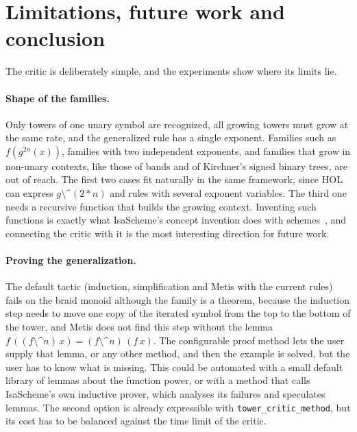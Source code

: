 \documentclass[preprint,12pt]{elsarticle}
\newcommand{\pw}[2]{#1^{#2}}               %
\newcommand{\pp}{\mathbin{\texttt{\^{}\^{}}}}     %
\newcommand{\fp}[2]{(#1 \pp #2)}                  %
\newcommand{\isa}[1]{\texttt{#1}}
\begin{document}
\section{Limitations, future work and conclusion}
\label{sec:conclusion}

The critic is deliberately simple, and the experiments show where its
limits lie.

\paragraph{Shape of the families.}
Only towers of one unary symbol are recognized, all growing towers must
grow at the same rate, and the generalized rule has a single exponent.
Families such as $f(\pw{g}{2n}(x))$, families with two independent
exponents, and families that grow in non-unary contexts, like those of
bands and of Kirchner's signed binary trees, are out of reach. The first
two cases fit naturally in the same framework, since HOL can express
$g \pp (2 * n)$ and rules with several exponent
variables. The third one needs a recursive function that builds the
growing context. Inventing such functions is exactly what IsaScheme's
concept invention does with schemes~\cite{MontanoRivas12}, and connecting
the critic with it is the most interesting direction for future work.

\paragraph{Proving the generalization.}
The default tactic (induction, simplification and Metis with the current
rules) fails on the braid monoid although the family is a theorem, because
the induction step needs to move one copy of the iterated symbol from the
top to the bottom of the tower, and Metis does not find this step without
the lemma $f\,(\fp{f}{n}\,x) = \fp{f}{n}\,(f\,x)$. The configurable proof
method lets the user supply that lemma, or any other method, and then the
example is solved, but the user has to know what is missing. This could be
automated with a small default library of lemmas about the function power,
or with a method that calls IsaScheme's own inductive prover, which
analyses its failures and speculates lemmas. The second option is already
expressible
with \isa{tower\_critic\_method}, but its cost has to be balanced
against the time limit of the critic.
\end{document}
